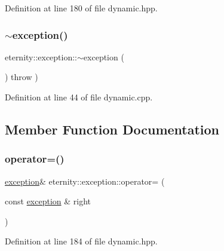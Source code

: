 Definition at line 180 of file dynamic.\+hpp.

\mbox{\label{classeternity_1_1exception_a88196166c38b9b66d790cf94be058e18}} 
\subsubsection{\texorpdfstring{$\sim$exception()}{~exception()}}
{\footnotesize\ttfamily eternity\+::exception\+::$\sim$exception (\begin{DoxyParamCaption}{ }\end{DoxyParamCaption}) throw  ) \hspace{0.3cm}{\ttfamily [virtual]}}



Definition at line 44 of file dynamic.\+cpp.



\subsection{Member Function Documentation}
\mbox{\label{classeternity_1_1exception_a9723617b72c37884f532451c578a3d39}} 
\subsubsection{\texorpdfstring{operator=()}{operator=()}}
{\footnotesize\ttfamily \hyperlink{classeternity_1_1exception}{exception}\& eternity\+::exception\+::operator= (\begin{DoxyParamCaption}\item[{const \hyperlink{classeternity_1_1exception}{exception} \&}]{right }\end{DoxyParamCaption})\hspace{0.3cm}{\ttfamily [inline]}}



Definition at line 184 of file dynamic.\+hpp.

\mbox{\label{classeternity_1_1exception_a5267219aab7b3bd423a6a751939928a6}} 
